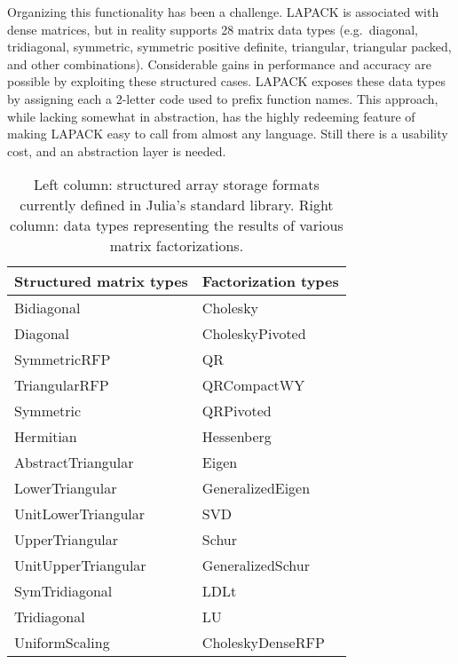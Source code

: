 Organizing this functionality has been a challenge.
LAPACK is associated with dense matrices, but in reality supports 28
matrix data types (e.g.\ diagonal, tridiagonal, symmetric, symmetric
positive definite, triangular, triangular packed, and other combinations).
Considerable gains in performance and accuracy are possible by exploiting
these structured cases.
LAPACK exposes these data types by assigning each a 2-letter code used to
prefix function names.
This approach, while lacking somewhat in abstraction, has the highly redeeming
feature of making LAPACK easy to call from almost any language.
Still there is a usability cost, and an abstraction layer is needed.

\begin{singlespace}
\begin{table}[!t]
\begin{center}
\begin{tabular}{|l|ll|}\hline
Structured matrix types & \multicolumn{2}{|c|}{Factorization types} \\
\hline
Bidiagonal             &  Cholesky         &   \\
Diagonal               &  CholeskyPivoted  &   \\
SymmetricRFP           &  QR               &  \\
TriangularRFP          &  QRCompactWY      &  \\
Symmetric              &  QRPivoted & \\
Hermitian              &  Hessenberg & \\
AbstractTriangular     &  Eigen & \\
LowerTriangular        &  GeneralizedEigen & \\
UnitLowerTriangular    &  SVD & \\
UpperTriangular        &  Schur & \\
UnitUpperTriangular    &  GeneralizedSchur & \\
SymTridiagonal         &  LDLt & \\
Tridiagonal            &  LU & \\
UniformScaling         &  CholeskyDenseRFP  & \\
\hline
\end{tabular}
\end{center}
\caption[Structured matrices and factorizations]{
\small{
Left column: structured array storage formats currently defined in Julia's
standard library.
Right column: data types representing the results of various matrix
factorizations.
}
}
\label{tab:matrixtypes}
\end{table}
\end{singlespace}

